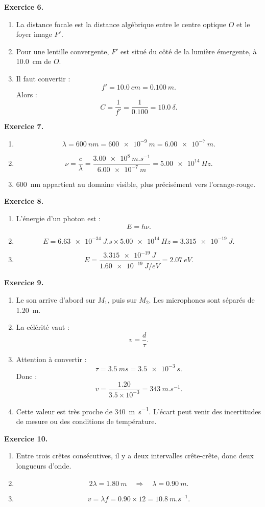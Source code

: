 \documentclass[11pt,a4paper]{article}
\newcommand{\corr}[2]{
  \begin{correctionbox}
  \textbf{Exercice #1.} #2
  \end{correctionbox}
}
\begin{document}
\corr{6}{
\begin{enumerate}
  \item La distance focale est la distance algébrique entre le centre optique $O$ et le foyer image $F'$.
  \item Pour une lentille convergente, $F'$ est situé du côté de la lumière émergente, à \SI{10.0}{cm} de $O$.
  \item Il faut convertir :
  \[
  f'=\SI{10.0}{cm}=\SI{0.100}{m}.
  \]
  Alors :
  \[
  C=\frac{1}{f'}=\frac{1}{0.100}=\SI{10.0}{\delta}.
  \]
\end{enumerate}
}

\corr{7}{
\begin{enumerate}
  \item
  \[
  \lambda=\SI{600}{nm}=\SI{600e-9}{m}=\SI{6.00e-7}{m}.
  \]
  \item
  \[
  \nu=\frac{c}{\lambda}=\frac{\SI{3.00e8}{m.s^{-1}}}{\SI{6.00e-7}{m}}
  =\SI{5.00e14}{Hz}.
  \]
  \item \SI{600}{nm} appartient au domaine visible, plus précisément vers l'orange-rouge.
\end{enumerate}
}

\corr{8}{
\begin{enumerate}
  \item L'énergie d'un photon est :
  \[
  E=h\nu.
  \]
  \item
  \[
  E=\SI{6.63e-34}{J.s}\times \SI{5.00e14}{Hz}
  =\SI{3.315e-19}{J}.
  \]
  \item
  \[
  E=\frac{\SI{3.315e-19}{J}}{\SI{1.60e-19}{J/eV}}
  =\SI{2.07}{eV}.
  \]
\end{enumerate}
}

\corr{9}{
\begin{enumerate}
  \item Le son arrive d'abord sur $M_1$, puis sur $M_2$. Les microphones sont séparés de \SI{1.20}{m}.
  \item La célérité vaut :
  \[
  v=\frac{d}{\tau}.
  \]
  \item Attention à convertir :
  \[
  \tau=\SI{3.5}{ms}=\SI{3.5e-3}{s}.
  \]
  Donc :
  \[
  v=\frac{1.20}{3.5\times 10^{-3}}=\SI{343}{m.s^{-1}}.
  \]
  \item Cette valeur est très proche de \SI{340}{m.s^{-1}}. L'écart peut venir des incertitudes de mesure ou des conditions de température.
\end{enumerate}
}

\corr{10}{
\begin{enumerate}
  \item Entre trois crêtes consécutives, il y a deux intervalles crête-crête, donc deux longueurs d'onde.
  \item
  \[
  2\lambda=\SI{1.80}{m}
  \quad \Rightarrow \quad
  \lambda=\SI{0.90}{m}.
  \]
  \item
  \[
  v=\lambda f=0.90\times 12=\SI{10.8}{m.s^{-1}}.
  \]
\end{enumerate}
}
\end{document}
